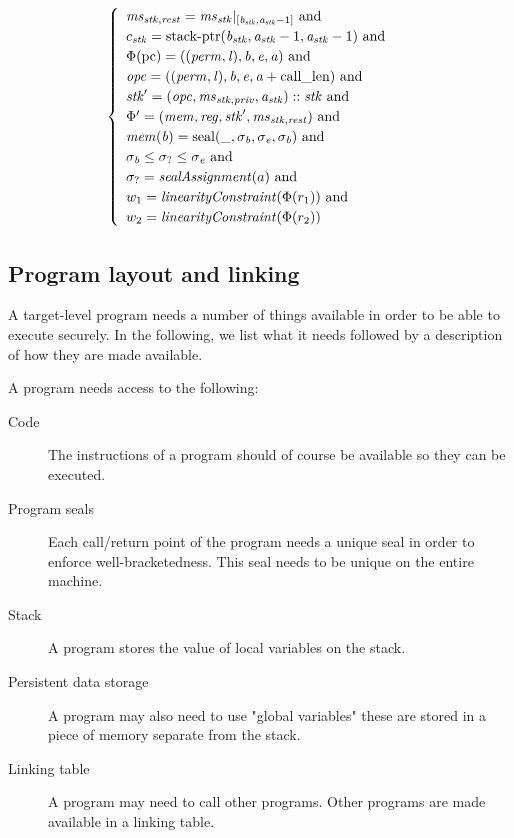 \documentclass[a3paper]{article}
\newcommand{\tand}{\text{ and }}
\newcommand{\shareddom}[1]{\mathrm{#1}}
\newcommand{\perm}{\var{perm}}
\newcommand{\lin}{\var{l}}
\newcommand{\stkptr}[1]{\mathrm{stack\text{-}ptr}(#1)}
\newcommand{\seal}[1]{\shareddom{seal}(#1)}
\newcommand{\var}[1]{\mathit{#1}}
\newcommand{\reg}{\var{reg}}
\newcommand{\mem}{\var{mem}}
\newcommand{\ms}{\var{ms}}
\newcommand{\stk}{\var{stk}}
\newcommand{\priv}{\var{priv}}
\newcommand{\opc}{\var{opc}}
\newcommand{\baddr}{\var{b}}
\newcommand{\eaddr}{\var{e}}
\newcommand{\aaddr}{\var{a}}
\newcommand{\constant}[1]{\mathrm{#1}}
\newcommand{\calllen}{\constant{call\_len}}
\newcommand{\pcreg}{\mathrm{pc}}
\newcommand{\plainfun}[2]{
  \ifthenelse{\equal{#2}{}}
  {\mathit{#1}}
  {\mathit{#1}(#2)}
}
\newcommand{\linCons}[1]{\plainfun{linearityConstraint}{#1}}
\newcommand{\sealAss}[1]{\plainfun{sealAssignment}{#1}}
\begin{document}
\begin{align*}
\begin{cases}
\begin{array}[t]{l}
                                                   \ms_{\stk,\var{rest}} = \ms_\stk|_{[\baddr_\stk,\aaddr_\stk - 1]} \tand \\
                                                   c_\stk = \stkptr{\baddr_\stk,\aaddr_\stk-1,\aaddr_\stk-1} \tand \\
                                                   \Phi(\pcreg) = ((\perm,\lin),\baddr,\eaddr,\aaddr) \tand \\
                                                   \opc = ((\perm,\lin),\baddr,\eaddr,\aaddr+\calllen) \tand \\
                                                   \stk' = (\opc,\ms_{\stk,\priv},\aaddr_\stk) :: \stk \tand\\
                                                   \Phi' = (\mem,\reg,\stk',\ms_{\stk,\var{rest}})\tand\\
                                                   \mem(\baddr) = \seal{\_,\sigma_\baddr,\sigma_\eaddr,\sigma_\baddr}\tand\\
                                                   \sigma_\baddr \leq \sigma_? \leq \sigma_\eaddr \tand\\
                                                   \sigma_? = \sealAss{a} \tand\\
                                                   w_1 = \linCons{\Phi(r_1)} \tand \\
                                                   w_2 = \linCons{\Phi(r_2)}
                                                 \end{array}
                                               \end{cases}
\end{align*}

\subsection{Program layout and linking}
A target-level program needs a number of things available in order to be able to execute securely. In the following, we list what it needs followed by a description of how they are made available.

A program needs access to the following:
\begin{description}
\item[Code] The instructions of a program should of course be available so they can be executed.
\item[Program seals] Each call/return point of the program needs a unique seal in order to enforce well-bracketedness. This seal needs to be unique on the entire machine.
\item[Stack] A program stores the value of local variables on the stack. 
\item[Persistent data storage] A program may also need to use "global variables" these are stored in a piece of memory separate from the stack.
\item[Linking table] A program may need to call other programs. Other programs are made available in a linking table.
\end{description}
\end{document}
